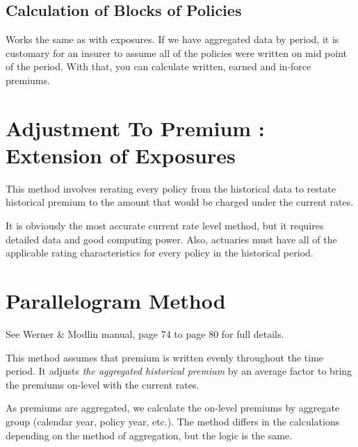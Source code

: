 \documentclass[11pt, english]{memoir}
\numberwithin{definition}{section}
\begin{document}
	\subsection{Calculation of Blocks of Policies}
	Works the same as with exposures. If we have aggregated data by period, it is customary for an insurer to assume all of the policies were written on mid point of the period. With that, you can calculate written, earned and in-force premiums. 
	
	
	\section{Adjustment To Premium : Extension of Exposures}
	This method involves rerating every policy from the historical data to restate historical premium to the amount that would be charged under the current rates. 
	
	It is obviously the most accurate current rate level method, but it requires detailed data and good computing power. Also, actuaries must have all of the applicable rating characteristics for every policy in the historical period. 
	
	\section{Parallelogram Method}
	See Werner \& Modlin manual, page 74 to page 80 for full details. 
	
	This method assumes that premium is written evenly throughout the time period. It adjusts\emph{ the aggregated historical premium} by an average factor to bring the premiums on-level with the current rates. 
	
	As premiums are aggregated, we calculate the on-level premiums by aggregate group (calendar year, policy year, etc.). The method differs in the calculations depending on the method of aggregation, but the logic is the same. 
	
\end{document}
